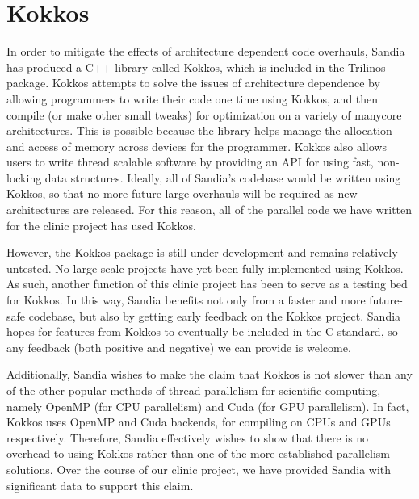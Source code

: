 \section{Kokkos}

In order to mitigate the effects of architecture dependent code overhauls, Sandia has produced a C++ library called
Kokkos, which is included in the Trilinos package. Kokkos attempts to solve the issues of architecture dependence 
by allowing programmers to write their code one time using Kokkos, and then compile (or make other small tweaks) 
for optimization on a variety of manycore architectures.
This is possible because the library helps manage the allocation and access of memory across devices for the
programmer. Kokkos also allows users to write thread scalable software by providing an API for
using fast, non-locking data structures. Ideally, all of Sandia's codebase would be written using Kokkos, so that 
no more future large overhauls will be required as new architectures are released. For this reason, all of 
the parallel code we have written for the clinic project has used Kokkos.

However, the Kokkos package is still under development and remains relatively untested. No
large-scale projects have yet been fully implemented using Kokkos. As such, another function of this clinic project 
has been to serve as a testing bed for Kokkos. 
In this way, Sandia benefits not only from a faster and more future-safe codebase, but also by getting early feedback 
on the Kokkos project. Sandia hopes for features from Kokkos to eventually be included in the C standard,
so any feedback (both positive and negative) we can provide is welcome. 

Additionally, Sandia wishes to 
make the claim that Kokkos is not slower than any of the other popular methods of thread parallelism for scientific
computing, namely OpenMP (for CPU parallelism) and Cuda (for GPU parallelism). In fact, Kokkos uses OpenMP and Cuda 
backends, for compiling on CPUs and GPUs respectively. Therefore, Sandia effectively wishes to show that there is 
no overhead to using Kokkos rather than one of the more established parallelism solutions. Over the course of our clinic
project, we have provided Sandia with significant data to support this claim.











